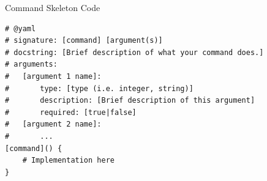 {
\begin{fileviewerbox}{Command Skeleton Code}
\begin{Verbatim}[breaklines=true]
# @yaml
# signature: [command] [argument(s)]
# docstring: [Brief description of what your command does.]
# arguments:
#   [argument 1 name]:
#       type: [type (i.e. integer, string)]
#       description: [Brief description of this argument]
#       required: [true|false]
#   [argument 2 name]:
#       ...
[command]() {
    # Implementation here
}
\end{Verbatim}
\end{fileviewerbox}
\captionsetup{type=figure}
\label{fig.interface.command_skeleton}
}